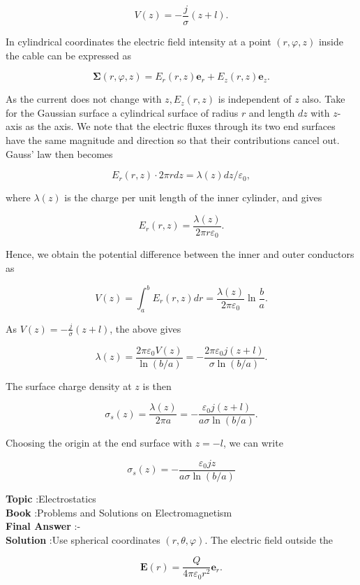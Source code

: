\documentclass[10pt]{article}
\begin{document}
$$
V(z)=-\frac{j}{\sigma}(z+l) .
$$

In cylindrical coordinates the electric field intensity at a point $(r, \varphi, z)$ inside the cable can be expressed as

$$
\mathbf{\Sigma}(r, \varphi, z)=E_{r}(r, z) \mathbf{e}_{r}+E_{z}(r, z) \mathbf{e}_{z} .
$$

As the current does not change with $z, E_{z}(r, z)$ is independent of $z$ also. Take for the Gaussian surface a cylindrical surface of radius $r$ and length $d z$ with $z$-axis as the axis. We note that the electric fluxes through its two end surfaces have the same magnitude and direction so that their contributions cancel out. Gauss' law then becomes

$$
E_{r}(r, z) \cdot 2 \pi r d z=\lambda(z) d z / \varepsilon_{0},
$$

where $\lambda(z)$ is the charge per unit length of the inner cylinder, and gives

$$
E_{r}(r, z)=\frac{\lambda(z)}{2 \pi r \varepsilon_{0}} .
$$

Hence, we obtain the potential difference between the inner and outer conductors as

$$
V(z)=\int_{a}^{b} E_{r}(r, z) d r=\frac{\lambda(z)}{2 \pi \varepsilon_{0}} \ln \frac{b}{a} .
$$

As $V(z)=-\frac{j}{\sigma}(z+l)$, the above gives

$$
\lambda(z)=\frac{2 \pi \varepsilon_{0} V(z)}{\ln (b / a)}=-\frac{2 \pi \varepsilon_{0} j(z+l)}{\sigma \ln (b / a)} .
$$

The surface charge density at $z$ is then

$$
\sigma_{s}(z)=\frac{\lambda(z)}{2 \pi a}=-\frac{\varepsilon_{0} j(z+l)}{a \sigma \ln (b / a)} .
$$

Choosing the origin at the end surface with $z=-l$, we can write

$$
\sigma_{s}(z)=-\frac{\varepsilon_{0} j z}{a \sigma \ln (b / a)}
$$


\textbf{Topic} :Electrostatics\\
\textbf{Book} :Problems and Solutions on Electromagnetism\\
\textbf{Final Answer} :-\\


\textbf{Solution} :Use spherical coordinates $(r, \theta, \varphi)$. The electric field outside the

$$
\mathbf{E}(r)=\frac{Q}{4 \pi \varepsilon_{0} r^{2}} \mathbf{e}_{r} .
$$
\end{document}
